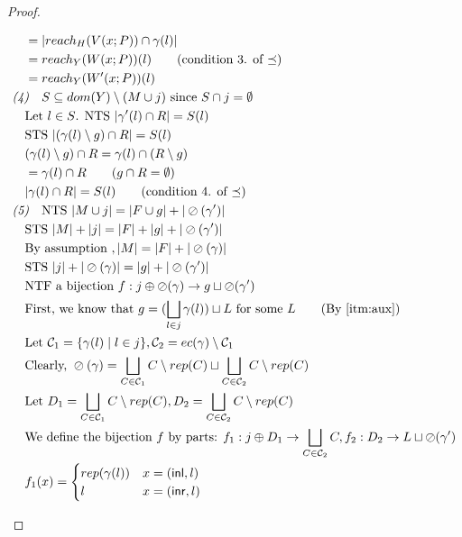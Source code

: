 \documentclass[11pt]{article}
\newcommand{\ms}[1]{\ensuremath{\mathsf{#1}}}
\newcommand{\oh}[1]{\oslash(#1)}
\theoremstyle{definition}
\begin{document}
\begin{proof}
\begin{description}
\begin{align*}
		&\quad = |reach_{H}(V(x;P)) \cap \gamma(l)|\\
		&\quad = reach_{Y}(W(x;P))(l) \tag{condition 3. of $\preceq$}\\
		&\quad = reach_{Y}(W'(x;P))(l) \\
		&\emph{(4)}\quad S \subseteq dom(Y) \setminus (M \cup j) \text{ since } S \cap j = \emptyset\\
		&\quad \text{Let } l \in S \text{. NTS } |\gamma'(l) \cap R| = S(l)\\
		&\quad \text{STS } |(\gamma(l)\setminus g) \cap R| = S(l)\\
		&\quad (\gamma(l)\setminus g) \cap R = \gamma(l) \cap (R \setminus g)\\
		&\quad = \gamma(l) \cap R \tag{$g \cap R = \emptyset$}\\
		&\quad |\gamma(l) \cap R| = S(l) \tag{condition 4. of $\preceq$}\\
		&\emph{(5)}\quad \text{NTS } |M \cup j| = |F \cup g| + |\oh{\gamma'}|\\
		&\quad \text{STS } |M| + |j| = |F| + | g| + |\oh{\gamma'}|\\
		&\quad \text{By assumption }, |M| = |F| + |\oh{\gamma}|\\
		&\quad \text{STS } |j| + |\oh{\gamma}| = |g| + |\oh{\gamma'}|\\
		&\quad \text{NTF a bijection } f : j \oplus \oh{\gamma} \to g \sqcup \oh{\gamma'}\\
		&\quad \text{First, we know that } g = (\bigsqcup_{l \in j} \gamma(l)) \sqcup L 
			\text{ for some } L \tag{By \ref{itm:aux}}\\
		&\quad \text{Let } \mathcal{C}_1 = \{\gamma(l) \mid l \in j\},
				\mathcal{C}_2 = ec(\gamma) \setminus \mathcal{C}_1\\
		&\quad \text{Clearly, } \oh{\gamma} = 
		\bigsqcup_{C  \in \mathcal{C}_1} C \setminus rep(C) \sqcup \bigsqcup_{C  \in \mathcal{C}_2} C \setminus rep(C)\\
		&\quad \text{Let } D_1 = \bigsqcup_{C  \in \mathcal{C}_1} C \setminus rep(C), 
		D_2 = \bigsqcup_{C  \in \mathcal{C}_2} C \setminus rep(C)\\
		&\quad \text{We define the bijection } 
			f \text{ by parts: } 
			f_1 : j \oplus D_1 \to \bigsqcup_{C \in \mathcal{C}_2} C, f_2 : D_2 \to L \sqcup \oh{\gamma'}\\
		&\quad f_1(x) =  
		\begin{cases}
			rep(\gamma(l)) &x = (\ms{inl},l)\\
			l &x = (\ms{inr},l)
		\end{cases}\\

\end{align*}
\end{description}
\end{proof}
\end{document}
